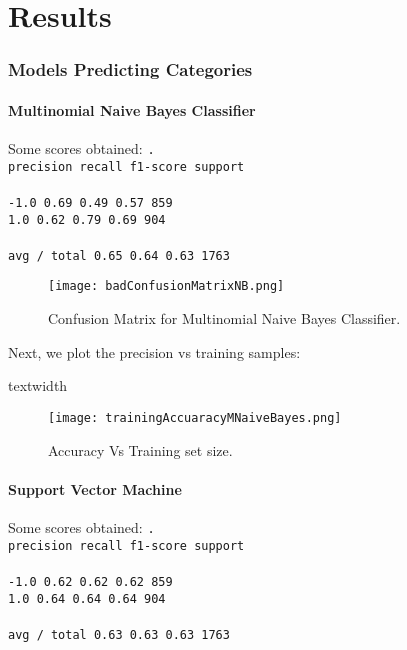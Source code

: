 
\chapter{Results}
\label{ch:results}

\subsection{Models Predicting Categories}
\subsubsection{Multinomial Naive Bayes Classifier}
Some scores obtained:
\texttt{.\\
             precision    recall  f1-score   support \\
\\
       -1.0       0.69      0.49      0.57       859\\
        1.0       0.62      0.79      0.69       904\\
\\
avg / total       0.65      0.64      0.63      1763\\
}

\begin{figure}[h]
	\label{fig:nbConfusion}
	\texttt{[image: badConfusionMatrixNB.png]}
    \caption{Confusion Matrix for Multinomial Naive Bayes Classifier.}
\end{figure}

Next, we plot the precision vs training samples:

textwidth%
\begin{figure}[h]
	\label{fig:partialResults1}
	\texttt{[image: trainingAccuaracyMNaiveBayes.png]}
    \caption{Accuracy Vs Training set size.}
\end{figure}


\subsubsection{Support Vector Machine}
Some scores obtained:
\texttt{.\\
     precision    recall  f1-score   support\\
\\
       -1.0       0.62      0.62      0.62       859\\
        1.0       0.64      0.64      0.64       904\\
\\
avg / total       0.63      0.63      0.63      1763\\
}